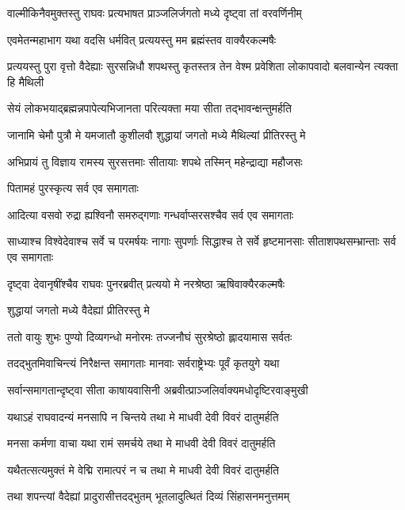 
\twolineshloka
{वाल्मीकिनैवमुक्तस्तु राघवः प्रत्यभाषत}
{प्राञ्जलिर्जगतो मध्ये दृष्ट्वा तां वरवर्णिनीम्} %

\twolineshloka
{एवमेतन्महाभाग यथा वदसि धर्मवित्}
{प्रत्ययस्तु मम ब्रह्मंस्तव वाक्यैरकल्मषैः} %

\threelineshloka
{प्रत्ययस्तु पुरा वृत्तो वैदेह्याः सुरसन्निधौ}
{शपथस्तु कृतस्तत्र तेन वेश्म प्रवेशिता}
{लोकापवादो बलवान्येन त्यक्ता हि मैथिली} %

\twolineshloka
{सेयं लोकभयाद्ब्रह्मन्नपापेत्यभिजानता}
{परित्यक्ता मया सीता तद्भावन्क्षन्तुमर्हति} %

\twolineshloka
{जानामि चेमौ पुत्रौ मे यमजातौ कुशीलवौ}
{शुद्धायां जगतो मध्ये मैथिल्यां प्रीतिरस्तु मे} %

\twolineshloka
{अभिप्रायं तु विज्ञाय रामस्य सुरसत्तमाः}
{सीतायाः शपथे तस्मिन् महेन्द्राद्या महौजसः} %

\onelineshloka
{पितामहं पुरस्कृत्य सर्व एव समागताः} %

\twolineshloka
{आदित्या वसवो रुद्रा ह्यश्विनौ समरुद्गणाः}
{गन्धर्वाप्सरसश्चैव सर्व एव समागताः} %

\threelineshloka
{साध्याश्च विश्वेदेवाश्च सर्वे च परमर्षयः}
{नागाः सुपर्णाः सिद्धाश्च ते सर्वे हृष्टमानसाः}
{सीताशपथसम्भ्रान्ताः सर्व एव समागताः} %

\twolineshloka
{दृष्ट्वा देवानृषींश्चैव राघवः पुनरब्रवीत्}
{प्रत्ययो मे नरश्रेष्ठा ऋषिवाक्यैरकल्मषैः} %

\onelineshloka
{शुद्धायां जगतो मध्ये वैदेह्यां प्रीतिरस्तु मे} %

\twolineshloka
{ततो वायुः शुभः पुण्यो दिव्यगन्धो मनोरमः}
{तज्जनौघं सुरश्रेष्ठो ह्लादयामास सर्वतः} %

\twolineshloka
{तदद्भुतमिवाचिन्त्यं निरैक्षन्त समागताः}
{मानवाः सर्वराष्ट्रेभ्यः पूर्वं कृतयुगे यथा} %

\twolineshloka
{सर्वान्समागतान्दृष्ट्वा सीता काषायवासिनी}
{अब्रवीत्प्राञ्जलिर्वाक्यमधोदृष्टिरवाङ्मुखी} %

\twolineshloka
{यथाऽहं राघवादन्यं मनसापि न चिन्तये}
{तथा मे माधवी देवी विवरं दातुमर्हति} %

\twolineshloka
{मनसा कर्मणा वाचा यथा रामं समर्चये}
{तथा मे माधवी देवी विवरं दातुमर्हति} %

\twolineshloka
{यथैतत्सत्यमुक्तं मे वेद्मि रामात्परं न च}
{तथा मे माधवी देवी विवरं दातुमर्हति} %

\twolineshloka
{तथा शपन्त्यां वैदेह्यां प्रादुरासीत्तदद्भुतम्}
{भूतलादुत्थितं दिव्यं सिंहासनमनुत्तमम्} %

